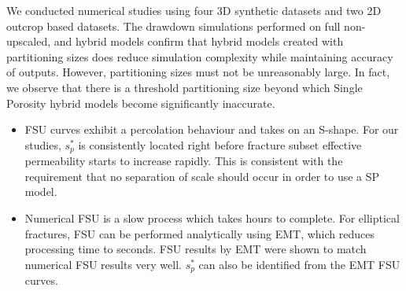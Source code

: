 \documentclass[a4paper]{article}
\begin{document}
We conducted numerical studies using four 3D synthetic datasets and two 2D outcrop based datasets. The drawdown simulations performed on full non-upscaled, and hybrid models confirm that hybrid models created with partitioning sizes does reduce simulation complexity while maintaining accuracy of outputs. However, partitioning sizes must not be unreasonably large. In fact, we observe that there is a threshold partitioning size beyond which Single Porosity hybrid models become significantly inaccurate.



\begin{itemize}
       
    \item FSU curves exhibit a percolation behaviour and takes on an S-shape. For our studies, $s_p^*$ is consistently located right before fracture subset effective permeability starts to increase rapidly. This is consistent with the requirement that no separation of scale should occur in order to use a SP model.
    
    \item Numerical FSU is a slow process which takes hours to complete. For elliptical fractures, FSU can be performed analytically using EMT, which reduces processing time to seconds. FSU results by EMT were shown to match numerical FSU results very well. $s_p^*$ can also be identified from the EMT FSU curves. 
    
\end{itemize}



\end{document}
